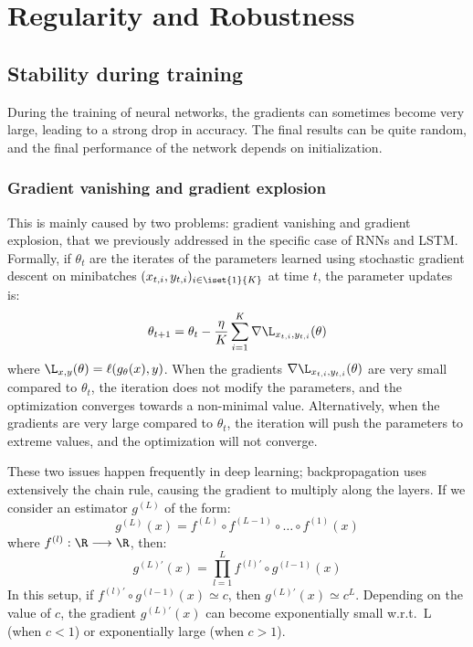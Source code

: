 \section{Regularity and Robustness}
\subsection{Stability during training}
During the training of neural networks, the gradients can sometimes become very large, leading to a strong drop in accuracy. The final results can be quite random, and the final performance of the network depends on initialization.

\subsubsection{Gradient vanishing and gradient explosion}
This is mainly caused by two problems: gradient vanishing and gradient explosion, that we previously addressed in the specific case of RNNs and LSTM. Formally, if $\theta_t$ are the iterates of the parameters learned using stochastic gradient descent on minibatches $(x_{t,i}, y_{t,i})_{i\in\iset{1}{K}}$ at time $t$, the parameter updates is:
\begin{equation*}
    \theta_{t+1}=\theta_t-\frac{\eta}{K}\sum_{i=1}^K \nabla\L_{x_{t,i}, y_{t,i}}(\theta)
\end{equation*}
where $\L_{x,y}(\theta)=\ell(g_\theta(x),y)$. When the gradients $\nabla\L_{x_{t,i}, y_{t,i}}(\theta)$ are very small compared to $\theta_t$, the iteration does not modify the parameters, and the optimization converges towards a non-minimal value. Alternatively, when the gradients are very large compared to $\theta_t$, the iteration will push the parameters to extreme values, and the optimization will not converge.

These two issues happen frequently in deep learning; backpropagation uses extensively the chain rule, causing the gradient to multiply along the layers. If we consider an estimator $g^{(L)}$ of the form:
\begin{equation*}
    g^{(L)}(x) = f^{(L)}\circ f^{(L-1)} \circ \dots\circ f^{(1)}(x)
\end{equation*}
where $f^{(l)}:\R\longrightarrow\R$, then:
\begin{equation*}
    g^{(L)'}(x) = \prod_{l=1}^L f^{(l)'} \circ g^{(l-1)}(x)
\end{equation*}
In this setup, if $f^{(l)'} \circ g^{(l-1)}(x) \simeq c$, then $g^{(L)'}(x) \simeq c^L$. Depending on the value of $c$, the gradient $g^{(L)'}(x)$ can become exponentially small w.r.t.~L (when $c<1$) or exponentially large (when $c>1$).


